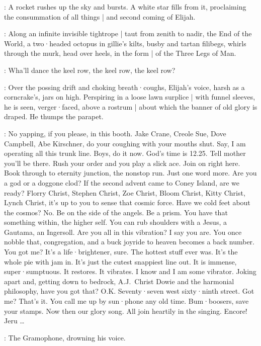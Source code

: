 :
A rocket rushes up the sky and bursts.
A white star fills from it,
proclaiming the consummation of all things |
and second coming of Elijah.

:
Along an infinite invisible tightrope |
taut from zenith to nadir,
the End of the World,
a two·headed octopus in gillie's kilts,
busby and tartan filibegs,
whirls through the murk,
head over heels,
in the form |
of the Three Legs of Man.

\EndOfWorld:
Wha'll dance the keel row,
the keel row,
the keel row?

:
Over the possing drift and choking breath·coughs,
Elijah's voice,
harsh as a corncrake's,
jars on high.
Perspiring in a loose lawn surplice |
with funnel sleeves,
he is seen,
verger·faced,
above a rostrum |
about which the banner of old glory is draped.
He thumps the parapet.

\Elijah:
No yapping,
if you please,
in this booth.
Jake Crane,
Creole Sue,
Dove Campbell,
Abe Kirschner,
do your coughing with your mouths shut.
Say,
I am operating all this trunk line.
Boys,
do it now.
God's time is 12.25.
Tell mother you'll be there.
Rush your order and you play a slick ace.
Join on right here.
Book through to eternity junction,
the nonstop run.
Just one word more.
Are you a god or a doggone clod?
If the second advent came to Coney Island,
are we ready?
Florry Christ,
Stephen Christ,
Zoe Christ,
Bloom Christ,
Kitty Christ,
Lynch Christ,
it's up to you to sense that cosmic force.
Have we cold feet about the cosmos?
No.
Be on the side of the angels.
Be a prism.
You have that something within,
the higher self.
You can rub shoulders with a Jesus,
a Gautama,
an Ingersoll.
Are you all in this vibration?
I say you are.
You once nobble that,
congregation,
and a buck joyride to heaven becomes a back number.
You got me?
It's a life·brightener,
sure.
The hottest stuff ever was.
It's the whole pie with jam in.
It's just the cutest snappiest line out.
It is immense,
super·sumptuous.
It restores.
It vibrates.
I know and I am some vibrator.
Joking apart and,
getting down to bedrock,
A.J.~Christ Dowie and the harmonial philosophy,
have you got that?
O.K.
Seventy·seven west sixty·ninth street.
Got me?
That's it.
You call me up by sun·phone any old time.
Bum·boosers,
save your stamps.
Now then our glory song.
All join heartily in the singing.
Encore!
Jeru \ldots

:
The Gramophone,
drowning his voice.

